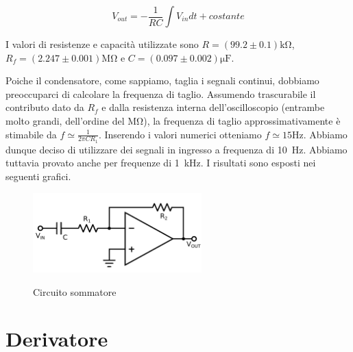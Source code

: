 $$V_{out}=-\frac{1}{RC} \int V_{in}dt +costante$$

I valori di resistenze e capacità utilizzate sono $R=(99.2 \pm 0.1)\si{\kilo\ohm}$, $R_f=(2.247 \pm 0.001)\si{\mega\ohm}$ e $C=(0.097 \pm 0.002) \si{\micro\farad}$. 

Poiche il condensatore, come sappiamo, taglia i segnali continui, dobbiamo preoccuparci di calcolare la frequenza di taglio. Assumendo trascurabile il contributo dato da $R_f$ e dalla resistenza interna dell'oscilloscopio (entrambe molto grandi, dell'ordine del $\si{\mega\ohm}$), la frequenza di taglio approssimativamente è stimabile da $f\simeq \frac{1}{2\pi C R_1}$. Inserendo i valori numerici otteniamo $f \simeq 15 \si{\hertz}$. Abbiamo dunque deciso di utilizzare dei segnali in ingresso a frequenza di \SI{10}{\hertz}. Abbiamo tuttavia provato anche per frequenze di \SI{1}{\kilo\hertz}. I risultati sono esposti nei seguenti grafici.

\begin{figure}
	\caption{Circuito sommatore}
	\includegraphics[width=65mm]{ccder.pdf}
	\label{fig:ccsum}
\end{figure}

\section{Derivatore}